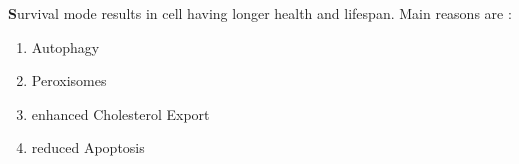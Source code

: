 \textbf Survival mode results in cell having longer health and lifespan. Main reasons are :
\begin{enumerate}
\item Autophagy
\item Peroxisomes
\item enhanced Cholesterol Export
\item reduced Apoptosis
\end{enumerate}